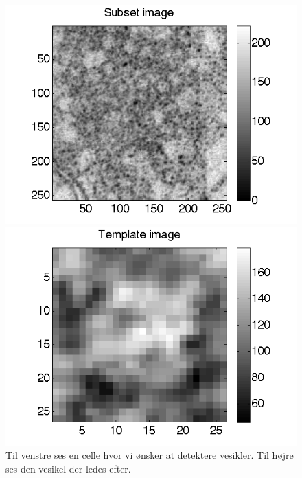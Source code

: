 \begin{figure}[H]
	\begin{minipage}[b]{0.5\linewidth}
		\centering
		\includegraphics[scale=0.5]{files/postmethod/img/conv_1.png}
	\end{minipage}
	\hspace{0.5cm}
	\begin{minipage}[b]{0.5\linewidth}
		\centering
		\includegraphics[scale=0.5]{files/postmethod/img/conv_2.png}
	\end{minipage}
	\caption{Til venstre ses en celle hvor vi ønsker at detektere vesikler. Til højre ses den vesikel der ledes efter.\label{fig:postmethod_conv_pre}}
\end{figure}

